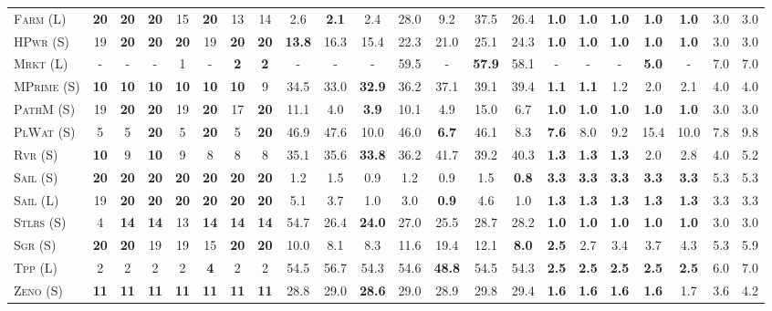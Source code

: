 \documentclass[11pt,landscape]{article}
\begin{document}
\begin{table*}[tb]
{\begin{tabular}{|l||ccccccc||ccccccc||ccccccc||}
\textsc{Farm} (L)&\textbf{20}&\textbf{20}&\textbf{20}&15&\textbf{20}&13&14&2.6&\textbf{2.1}&2.4&28.0&9.2&37.5&26.4&\textbf{1.0}&\textbf{1.0}&\textbf{1.0}&\textbf{1.0}&\textbf{1.0}&3.0&3.0\\
\textsc{HPwr} (S)&19&\textbf{20}&\textbf{20}&\textbf{20}&19&\textbf{20}&\textbf{20}&\textbf{13.8}&16.3&15.4&22.3&21.0&25.1&24.3&\textbf{1.0}&\textbf{1.0}&\textbf{1.0}&\textbf{1.0}&\textbf{1.0}&3.0&3.0\\
\textsc{Mrkt} (L)&-&-&-&1&-&\textbf{2}&\textbf{2}&-&-&-&59.5&-&\textbf{57.9}&58.1&-&-&-&\textbf{5.0}&-&7.0&7.0\\
\textsc{MPrime} (S)&\textbf{10}&\textbf{10}&\textbf{10}&\textbf{10}&\textbf{10}&\textbf{10}&9&34.5&33.0&\textbf{32.9}&36.2&37.1&39.1&39.4&\textbf{1.1}&\textbf{1.1}&1.2&2.0&2.1&4.0&4.0\\
\textsc{PathM} (S)&19&\textbf{20}&\textbf{20}&19&\textbf{20}&17&\textbf{20}&11.1&4.0&\textbf{3.9}&10.1&4.9&15.0&6.7&\textbf{1.0}&\textbf{1.0}&\textbf{1.0}&\textbf{1.0}&\textbf{1.0}&3.0&3.0\\
\textsc{PlWat} (S)&5&5&\textbf{20}&5&\textbf{20}&5&\textbf{20}&46.9&47.6&10.0&46.0&\textbf{6.7}&46.1&8.3&\textbf{7.6}&8.0&9.2&15.4&10.0&7.8&9.8\\
\textsc{Rvr} (S)&\textbf{10}&9&\textbf{10}&9&8&8&8&35.1&35.6&\textbf{33.8}&36.2&41.7&39.2&40.3&\textbf{1.3}&\textbf{1.3}&\textbf{1.3}&2.0&2.8&4.0&5.2\\
\textsc{Sail} (S)&\textbf{20}&\textbf{20}&\textbf{20}&\textbf{20}&\textbf{20}&\textbf{20}&\textbf{20}&1.2&1.5&0.9&1.2&0.9&1.5&\textbf{0.8}&\textbf{3.3}&\textbf{3.3}&\textbf{3.3}&\textbf{3.3}&\textbf{3.3}&5.3&5.3\\
\textsc{Sail} (L)&19&\textbf{20}&\textbf{20}&\textbf{20}&\textbf{20}&\textbf{20}&\textbf{20}&5.1&3.7&1.0&3.0&\textbf{0.9}&4.6&1.0&\textbf{1.3}&\textbf{1.3}&\textbf{1.3}&\textbf{1.3}&\textbf{1.3}&3.3&3.3\\
\textsc{Stlrs} (S)&4&\textbf{14}&\textbf{14}&13&\textbf{14}&\textbf{14}&\textbf{14}&54.7&26.4&\textbf{24.0}&27.0&25.5&28.7&28.2&\textbf{1.0}&\textbf{1.0}&\textbf{1.0}&\textbf{1.0}&\textbf{1.0}&3.0&3.0\\
\textsc{Sgr} (S)&\textbf{20}&\textbf{20}&19&19&15&\textbf{20}&\textbf{20}&10.0&8.1&8.3&11.6&19.4&12.1&\textbf{8.0}&\textbf{2.5}&2.7&3.4&3.7&4.3&5.3&5.9\\
\textsc{Tpp} (L)&2&2&2&2&\textbf{4}&2&2&54.5&56.7&54.3&54.6&\textbf{48.8}&54.5&54.3&\textbf{2.5}&\textbf{2.5}&\textbf{2.5}&\textbf{2.5}&\textbf{2.5}&6.0&7.0\\
\textsc{Zeno} (S)&\textbf{11}&\textbf{11}&\textbf{11}&\textbf{11}&\textbf{11}&\textbf{11}&\textbf{11}&28.8&29.0&\textbf{28.6}&29.0&28.9&29.8&29.4&\textbf{1.6}&\textbf{1.6}&\textbf{1.6}&\textbf{1.6}&1.7&3.6&4.2\\

\end{tabular}}
\end{table*}
\end{document}
